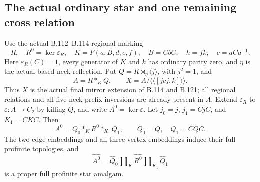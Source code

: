 \subsection*{The actual ordinary star and one remaining cross relation}
\label{stmt:B125}
Use the actual B.112--B.114 regional marking
\[
 R,\quad R^0=\ker\varepsilon_R,\quad K=F(a,B,d,e,f),\quad
 B=CbC,\quad h=fk,\quad c=aCa^{-1}.
\]
Here $\varepsilon_R(C)=1$, every generator of $K$ and $k$ has
ordinary parity zero, and $\eta$ is the actual based neck reflection.
Put $Q=K\rtimes_\eta\langle j\rangle$, with $j^2=1$, and
\begin{equation}\label{eq:B125-pre-cross}
 A=R*_{K}Q,\qquad
 X=A/\langle\!\langle[jcj,k]\rangle\!\rangle.
\end{equation}
Thus $X$ is the actual final mirror extension of B.114 and B.121;
all regional relations and all five neck-prefix inversions are already
present in $A$. Extend $\varepsilon_R$ to $\varepsilon:A\to C_2$
by killing $Q$, and write $A^0=\ker\varepsilon$.
Let $j_0=j$, $j_1=CjC$, and $K_1=CKC$. Then
\begin{equation}\label{eq:B125-star}
 A^0=Q_0*_{K}R^0*_{K_1}Q_1,
 \qquad Q_0=Q,\quad Q_1=CQC.
\end{equation}
The two edge embeddings and all three vertex embeddings induce their
full profinite topologies, and
\begin{equation}\label{eq:B125-completed-star}
 \widehat{A^0}
 =\widehat Q_0\amalg_{\widehat K}\widehat{R^0}
       \amalg_{\widehat K_1}\widehat Q_1
\end{equation}
is a proper full profinite star amalgam.

